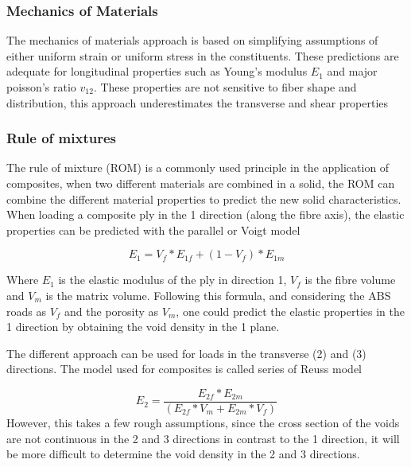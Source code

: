 \subsubsection{Mechanics of Materials}
The mechanics of materials approach is based on simplifying assumptions of either uniform strain or uniform stress in the constituents. These predictions are adequate for longitudinal properties such as Young's modulus $E_1$ and major poisson's ratio $v_{12}$. These properties are not sensitive to fiber shape and distribution, this approach underestimates the transverse and shear properties\cite{Ishai2006EngineeringMaterials}

\subsubsection{Rule of mixtures}
The rule of mixture (ROM) is a commonly used principle in the application of composites, when two different materials are combined in a solid, the ROM can combine the different material properties to predict the new solid characteristics. When loading a composite ply in the 1 direction (along the fibre axis), the elastic properties can be predicted with the parallel or Voigt model\cite{Ishai2006EngineeringMaterials} \cite{Mabessatudelftnl2018MS43025Theory}

\begin{equation} \label{eqn:Voigt}
E_1=V_f*E_{1f}+(1-V_f)*E_{1m}
\end{equation}

Where $E_1$ is the elastic modulus of the ply in direction 1, $V_f$ is the fibre volume and $V_m$ is the matrix volume. Following this formula, and considering the ABS roads as $V_f$ and the porosity as $V_m$, one could predict the elastic properties in the 1 direction by obtaining the void density in the 1 plane.

The different approach can be used for loads in the transverse (2) and (3) directions. The model used for composites is called series of Reuss model \cite{Ishai2006EngineeringMaterials} \cite{Mabessatudelftnl2018MS43025Theory}

\begin{equation} \label{eqn:Reuss}
E_2=\frac{E_{2f}*E_{2m}}{(E_{2f}*V_m+E_{2m}*V_f)}
\end{equation}
However, this takes a few rough assumptions, since the cross section of the voids are not continuous in the 2 and 3 directions in contrast to the 1 direction, it will be more difficult to determine the void density in the 2 and 3 directions. 

